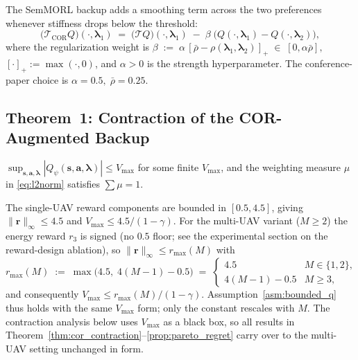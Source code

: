 The SemMORL backup adds a smoothing term across the two preferences
whenever stiffness drops below the threshold:
\begin{equation}
\label{eq:Tcor}
\big(\mathcal{T}_{\text{COR}}Q\big)(\cdot,\bm{\lambda}_1)
\;=\;
\big(\mathcal{T}Q\big)(\cdot,\bm{\lambda}_1)
\;-\;
\beta\;
\big(Q(\cdot,\bm{\lambda}_1) - Q(\cdot,\bm{\lambda}_2)\big),
\end{equation}
where the regularization weight is
$
\beta \;:=\; \alpha\,[\bar{\rho}-\rho(\bm{\lambda}_1,\bm{\lambda}_2)]_+
\;\in\;[0,\alpha\bar{\rho}],
$
$[\cdot]_+:=\max(\cdot,0)$, and $\alpha>0$ is the strength hyperparameter.
The conference-paper choice is $\alpha=0.5,\;\bar{\rho}=0.25$.

\subsection{Theorem~1: Contraction of the COR-Augmented Backup}
\label{ssec:theorem1}

\begin{assumption}
\label{asm:bounded_q}
$\sup_{\mathbf{s},\mathbf{a},\bm{\lambda}} |Q_\psi(\mathbf{s},\mathbf{a},
\bm{\lambda})| \le V_{\max}$ for some finite $V_{\max}$, and the
weighting measure $\mu$ in \eqref{eq:l2norm} satisfies $\sum\mu = 1$.
\end{assumption}

The single-UAV reward components are bounded in $[0.5, 4.5]$, giving
$\|\mathbf{r}\|_\infty \le 4.5$ and $V_{\max} \le 4.5/(1-\gamma)$. For the
multi-UAV variant ($M\ge 2$) the energy reward $r_3$ is signed (no $0.5$
floor; see the experimental section on the reward-design ablation), so
$\|\mathbf{r}\|_\infty \le r_{\max}(M)$ with
\begin{equation}
\label{eq:rmax_M}
r_{\max}(M) \;:=\; \max\!\bigl(4.5,\;4(M-1)-0.5\bigr)
\;=\;
\begin{cases}
4.5 & M\in\{1,2\},\\
4(M-1)-0.5 & M\ge 3,
\end{cases}
\end{equation}
and consequently $V_{\max} \le r_{\max}(M)/(1-\gamma)$.
Assumption~\ref{asm:bounded_q} thus holds with the same $V_{\max}$ form;
only the constant rescales with $M$. The contraction analysis below uses
$V_{\max}$ as a black box, so all results in
Theorem~\ref{thm:cor_contraction}--\ref{prop:pareto_regret} carry over to
the multi-UAV setting unchanged in form.

